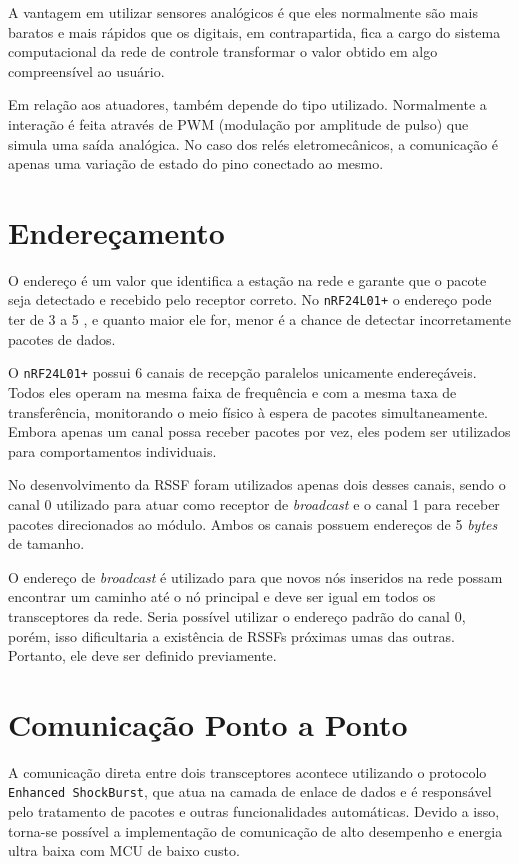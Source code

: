 A vantagem em utilizar sensores analógicos é que eles normalmente são mais baratos e mais rápidos que os
digitais, em contrapartida, fica a cargo do sistema computacional da rede de controle transformar o valor
obtido em algo compreensível ao usuário.

Em relação aos atuadores, também depende do tipo utilizado. Normalmente a interação é feita através de PWM
(modulação por amplitude de pulso) que simula uma saída analógica. No caso dos relés eletromecânicos, a
comunicação é apenas uma variação de estado do pino conectado ao mesmo.

\section{Endereçamento}
O endereço é um valor que identifica a estação na rede e garante que o pacote seja detectado e recebido pelo
receptor correto. No \texttt{nRF24L01+} o endereço pode ter de 3 a 5 , e quanto maior ele for,
menor é a chance de detectar incorretamente pacotes de dados.

O \texttt{nRF24L01+} possui 6 canais de recepção paralelos unicamente endereçáveis. Todos eles operam na mesma
faixa de frequência e com a mesma taxa de transferência, monitorando o meio físico à espera de pacotes
simultaneamente. Embora apenas um canal possa receber pacotes por vez, eles podem ser utilizados para
comportamentos individuais.

No desenvolvimento da RSSF foram utilizados apenas dois desses canais, sendo o canal 0 utilizado para atuar
como receptor de \textit{broadcast} e o canal 1 para receber pacotes direcionados ao módulo. Ambos os canais
possuem endereços de 5 \textit{bytes} de tamanho.

O endereço de \textit{broadcast} é utilizado para que novos nós inseridos na rede possam encontrar um caminho
até o nó principal e deve ser igual em todos os transceptores da rede. Seria possível utilizar o endereço
padrão do canal 0, porém, isso dificultaria a existência de RSSFs próximas umas das outras. Portanto, ele deve
ser definido previamente.

\section{Comunicação Ponto a Ponto}
A comunicação direta entre dois transceptores acontece utilizando o protocolo \texttt{Enhanced ShockBurst},
que atua na camada de enlace de dados e é responsável pelo tratamento de pacotes e outras funcionalidades
automáticas. Devido a isso, torna-se possível a implementação de comunicação de alto desempenho e energia
ultra baixa com MCU de baixo custo.

